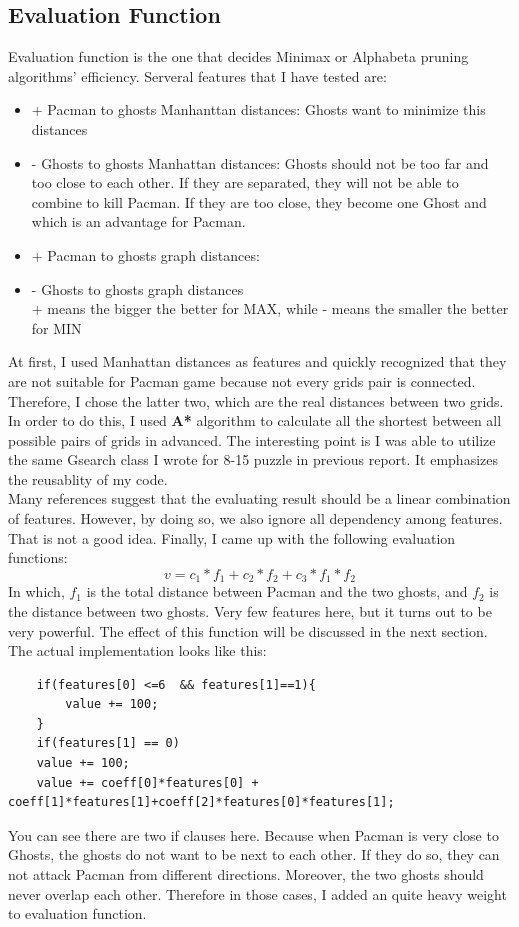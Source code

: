 \documentclass[a4paper, 11pt]{article}
\begin{document}
\subsection{Evaluation Function}
Evaluation function is the one that decides Minimax or Alphabeta pruning algorithms' efficiency. Serveral features that I have tested are:
\begin{itemize}
\item{+} Pacman to ghosts Manhanttan distances: Ghosts want to minimize this distances
\item{-} Ghosts to ghosts Manhattan distances: Ghosts should not be too far and too close to each other. If they are separated, they will not be able to combine to kill Pacman. If they are too close, they become one Ghost and which is an advantage for Pacman.
\item{+} Pacman to ghosts graph distances:
\item{-} Ghosts to ghosts graph distances \\
+ means the bigger the better for MAX, while - means the smaller the better for MIN
\end{itemize}
At first, I used Manhattan distances as features and quickly recognized that they are not suitable for Pacman game because not every grids pair is connected. Therefore, I chose the latter two, which are the real distances between two grids. In order to do this, I used \textbf{A*} algorithm to calculate all the shortest between all possible pairs of grids in advanced. The interesting point is I was able to utilize the same Gsearch class I wrote for 8-15 puzzle in previous report. It emphasizes the reusablity of my code. \\
Many references suggest that the evaluating result should be a linear combination of features. However, by doing so, we also ignore all dependency among features. That is not a good idea. Finally, I came up with the following evaluation functions: 
\[ v = c_1*f_1+c_2*f_2+c_3*f_1*f_2\]
In which, $f_1$ is the total distance between Pacman and the two ghosts, and $f_2$ is the distance between two ghosts. Very few features here, but it turns out to be very powerful. The effect of this function will be discussed in the next section. \\
The actual implementation looks like this:
\begin{lstlisting}
    if(features[0] <=6  && features[1]==1){
     	value += 100;
    }
    if(features[1] == 0)
	value += 100;
    value += coeff[0]*features[0] + coeff[1]*features[1]+coeff[2]*features[0]*features[1];
\end{lstlisting}
You can see there are two if clauses here. Because when Pacman is very close to Ghosts, the ghosts do not want to be next to each other. If they do so, they can not attack Pacman from different directions. Moreover, the two ghosts should never overlap each other. Therefore in those cases, I added an quite heavy weight to evaluation function. 
\end{document}
